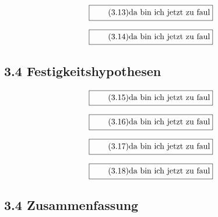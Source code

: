 \documentclass[11pt]{article}
\newcommand{\1}{ {\mathds{1}} }
\begin{document}
    \begin{equation}
      \boxed{
        \tag{3.13}
        \begin{split}
          \text{da bin ich jetzt zu faul}
        \end{split}
      }
    \end{equation}

    \begin{equation}
      \boxed{
        \tag{3.14}
        \begin{split}
          \text{da bin ich jetzt zu faul}
        \end{split}
      }
    \end{equation}

    \subsection*{3.4 Festigkeitshypothesen}

    \begin{equation}
      \boxed{
        \tag{3.15}
        \begin{split}
          \text{da bin ich jetzt zu faul}
        \end{split}
      }
    \end{equation}

    \begin{equation}
      \boxed{
        \tag{3.16}
        \begin{split}
          \text{da bin ich jetzt zu faul}
        \end{split}
      }
    \end{equation}

    \begin{equation}
      \boxed{
        \tag{3.17}
        \begin{split}
          \text{da bin ich jetzt zu faul}
        \end{split}
      }
    \end{equation}

    \begin{equation}
      \boxed{
        \tag{3.18}
        \begin{split}
          \text{da bin ich jetzt zu faul}
        \end{split}
      }
    \end{equation}

    \subsection*{3.4 Zusammenfassung}
\end{document}
